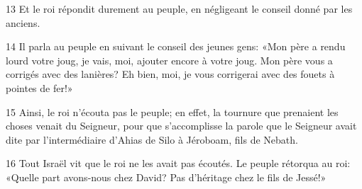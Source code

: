 
13 Et le roi répondit durement au peuple, en négligeant le conseil donné par les anciens.

14 Il parla au peuple en suivant le conseil des jeunes gens: «Mon père a rendu lourd votre joug, je vais, moi, ajouter encore à votre joug. Mon père vous a corrigés avec des lanières? Eh bien, moi, je vous corrigerai avec des fouets à pointes de fer!»

15 Ainsi, le roi n’écouta pas le peuple; en effet, la tournure que prenaient les choses venait du Seigneur, pour que s’accomplisse la parole que le Seigneur avait dite par l’intermédiaire d’Ahias de Silo à Jéroboam, fils de Nebath.

16 Tout Israël vit que le roi ne les avait pas écoutés. Le peuple rétorqua au roi: «Quelle part avons-nous chez David? Pas d’héritage chez le fils de Jessé!»